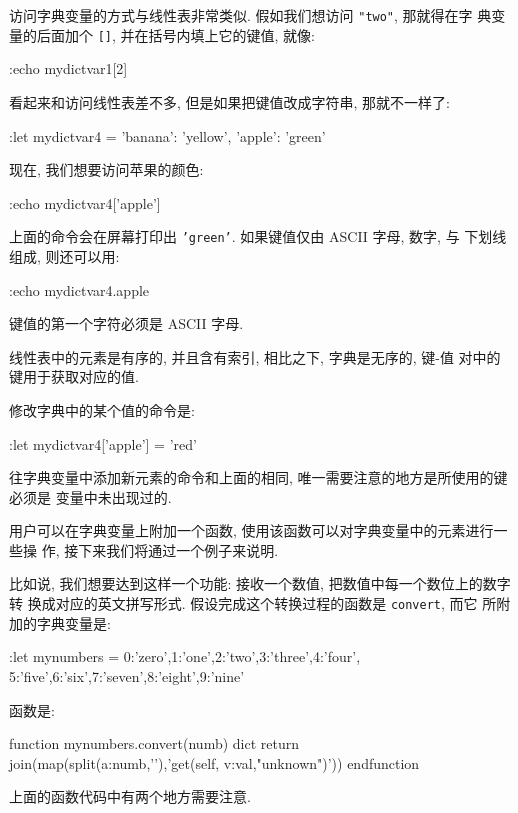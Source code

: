 访问字典变量的方式与线性表非常类似. 假如我们想访问 \texttt{"two"}, 那就得在字
典变量的后面加个 \texttt{[]}, 并在括号内填上它的键值, 就像:
\begin{vimcode}
:echo mydictvar1[2]
\end{vimcode}

看起来和访问线性表差不多, 但是如果把键值改成字符串, 那就不一样了:
\begin{vimcode}
:let mydictvar4 = {'banana': 'yellow', 'apple': 'green'}
\end{vimcode}
现在, 我们想要访问苹果的颜色:
\begin{vimcode}
:echo mydictvar4['apple']
\end{vimcode}
上面的命令会在屏幕打印出 \texttt{'green'}. 如果键值仅由 ASCII 字母, 数字, 与
下划线组成, 则还可以用:
\begin{vimcode}
:echo mydictvar4.apple
\end{vimcode}
键值的第一个字符必须是 ASCII 字母.

线性表中的元素是有序的, 并且含有索引, 相比之下, 字典是无序的, \mbox{键}-值
对中的键用于获取对应的值.

修改字典中的某个值的命令是:
\begin{vimcode}
:let mydictvar4['apple'] = 'red'
\end{vimcode}
往字典变量中添加新元素的命令和上面的相同, 唯一需要注意的地方是所使用的键必须是
变量中未出现过的.

用户可以在字典变量上附加一个函数, 使用该函数可以对字典变量中的元素进行一些操
作, 接下来我们将通过一个例子来说明.

比如说, 我们想要达到这样一个功能: 接收一个数值, 把数值中每一个数位上的数字转
换成对应的英文拼写形式. 假设完成这个转换过程的函数是 \texttt{convert}, 而它
所附加的字典变量是:
\begin{vimcode}
:let mynumbers = {0:'zero',1:'one',2:'two',3:'three',4:'four',
                5:'five',6:'six',7:'seven',8:'eight',9:'nine'}
\end{vimcode}
函数是:
\begin{vimcode}
function mynumbers.convert(numb) dict
    return join(map(split(a:numb,'\zs'),'get(self, v:val,"unknown")'))
endfunction
\end{vimcode}
上面的函数代码中有两个地方需要注意.

